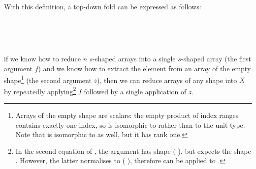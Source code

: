 With this definition, a top-down fold can be expressed as
follows:
\begin{code}%
\>[0][@{}l@{\AgdaIndent{2}}]%
\>[2]%
\>[12]\AgdaSymbol{:}\AgdaSpace{}%
\AgdaSpace{}%
\AgdaSymbol{\{}\AgdaSpace{}%
\AgdaSymbol{\}}\AgdaSpace{}%
\AgdaSpace{}%
\AgdaSpace{}%
\AgdaSymbol{(}\AgdaOperator{\AgdaFunction{[}}\AgdaSpace{}%
\AgdaSpace{}%
\AgdaOperator{\AgdaFunction{]}}\AgdaSpace{}%
\AgdaOperator{\AgdaFunction{++}}\AgdaSpace{}%
\AgdaSymbol{)}\AgdaSpace{}%
\AgdaSpace{}%
\AgdaSpace{}%
\AgdaSpace{}%
\AgdaSpace{}%
\AgdaSymbol{)}\AgdaSpace{}%
\AgdaSpace{}%
\AgdaSymbol{(}\AgdaSpace{}%
\AgdaInductiveConstructor{[]}\AgdaSpace{}%
\AgdaSpace{}%
\AgdaSpace{}%
\AgdaSymbol{)}\<%
\\
%
\>[12]\AgdaSpace{}%
\AgdaSpace{}%
\AgdaSpace{}%
\AgdaSpace{}%
\AgdaSpace{}%
\AgdaSpace{}%
\AgdaSpace{}%
\AgdaSpace{}%
\<%
\\
%
\>[2]%
\>[12]\AgdaSpace{}%
\AgdaSpace{}%
\AgdaInductiveConstructor{[]}%
\>[25]%
\>[28]\AgdaSymbol{=}\AgdaSpace{}%
\AgdaSpace{}%
\<%
\\
%
\>[2]%
\>[12]\AgdaSpace{}%
\AgdaSpace{}%
\AgdaSymbol{(}\AgdaSpace{}%
\AgdaSpace{}%
\AgdaSymbol{)}%
\>[25]%
\>[28]\AgdaSymbol{=}\AgdaSpace{}%
\AgdaSpace{}%
\AgdaSpace{}%
\AgdaSpace{}%
\AgdaSpace{}%
\AgdaSymbol{(}\AgdaSpace{}%
\AgdaSymbol{)}\<%
\end{code}
if we know how to reduce $n$ $s$-shaped arrays into a single $s$-shaped
array (the first argument $f$) and we know how to extract the element
from an array of the empty shape\footnote{Arrays of the empty shape are
scalars: the empty product of index ranges contains exactly one index, so
\;\AC{[]}\; is isomorphic to  rather than to the unit type.
Note that \;\AF{[}\;\AF{]}\; is isomorphic to  as well,
but it has rank one.}
(the second argument $z$), then we can
reduce arrays of any shape into $X$ by repeatedly applying\footnote{
In the second equation of , the argument  has shape (  ),
but  expects the shape \AF{[}  \AF{]} \AF{++} .  However,
the latter normalises to (  ), therefore  can be
applied to .
} $f$ followed
by a single application of $z$.

